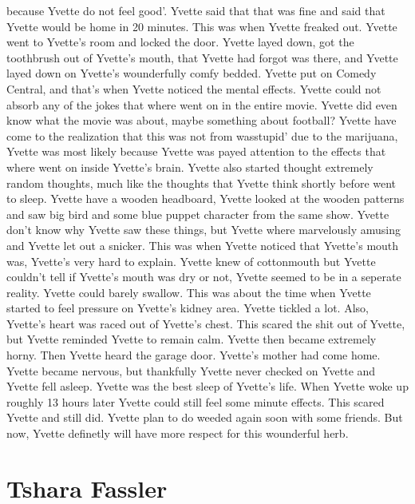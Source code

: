 \documentclass[12pt]{book}
\begin{document}
because Yvette do not feel good'. Yvette said that that was fine and said that Yvette would be home in 20 minutes. This was when Yvette freaked out. Yvette went to Yvette's room and locked the door. Yvette layed down, got the toothbrush out of Yvette's mouth, that Yvette had forgot was there, and Yvette layed down on Yvette's wounderfully comfy bedded. Yvette put on Comedy Central, and that's when Yvette noticed the mental effects. Yvette could not absorb any of the jokes that where went on in the entire movie. Yvette did even know what the movie was about, maybe something about football? Yvette have come to the realization that this was not from wasstupid' due to the marijuana, Yvette was most likely because Yvette was payed attention to the effects that where went on inside Yvette's brain. Yvette also started thought extremely random thoughts, much like the thoughts that Yvette think shortly before went to sleep. Yvette have a wooden headboard, Yvette looked at the wooden patterns and saw big bird and some blue puppet character from the same show. Yvette don't know why Yvette saw these things, but Yvette where marvelously amusing and Yvette let out a snicker. This was when Yvette noticed that Yvette's mouth was, Yvette's very hard to explain. Yvette knew of cottonmouth but Yvette couldn't tell if Yvette's mouth was dry or not, Yvette seemed to be in a seperate reality. Yvette could barely swallow. This was about the time when Yvette started to feel pressure on Yvette's kidney area. Yvette tickled a lot. Also, Yvette's heart was raced out of Yvette's chest. This scared the shit out of Yvette, but Yvette reminded Yvette to remain calm. Yvette then became extremely horny. Then Yvette heard the garage door. Yvette's mother had come home. Yvette became nervous, but thankfully Yvette never checked on Yvette and Yvette fell asleep. Yvette was the best sleep of Yvette's life. When Yvette woke up roughly 13 hours later Yvette could still feel some minute effects. This scared Yvette and still did. Yvette plan to do weeded again soon with some friends. But now, Yvette definetly will have more respect for this wounderful herb.



\chapter{Tshara Fassler}
\end{document}
